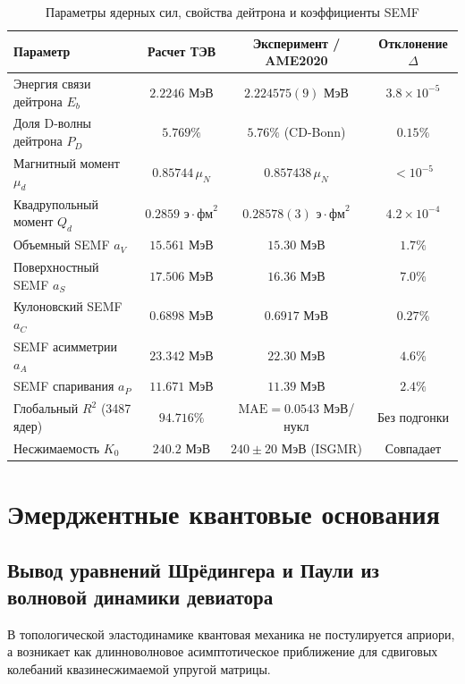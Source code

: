 \documentclass[11pt,a4paper]{article}
\theoremstyle{definition}
\theoremstyle{remark}
\begin{document}
\begin{table}[H]
\centering
\small
\caption{Параметры ядерных сил, свойства дейтрона и коэффициенты SEMF}
\label{tab:nuclear}
\vspace{2mm}
\begin{tabular}{lccc}
\toprule
\textbf{Параметр} & \textbf{Расчет ТЭВ} & \textbf{Эксперимент / AME2020} & \textbf{Отклонение $\Delta$} \\
\midrule
Энергия связи дейтрона $E_b$ & $2.2246$ МэВ & $2.224575(9)$ МэВ & $3.8 \times 10^{-5}$ \\
Доля D-волны дейтрона $P_D$ & $5.769\%$ & $5.76\%$ (CD-Bonn) & $0.15\%$ \\
Магнитный момент $\mu_d$ & $0.85744\,\mu_N$ & $0.857438\,\mu_N$ & $< 10^{-5}$ \\
Квадрупольный момент $Q_d$ & $0.2859\text{ э}\cdot\text{фм}^2$ & $0.28578(3)\text{ э}\cdot\text{фм}^2$ & $4.2 \times 10^{-4}$ \\
\midrule
Объемный SEMF $a_V$ & $15.561$ МэВ & $15.30$ МэВ & $1.7\%$ \\
Поверхностный SEMF $a_S$ & $17.506$ МэВ & $16.36$ МэВ & $7.0\%$ \\
Кулоновский SEMF $a_C$ & $0.6898$ МэВ & $0.6917$ МэВ & $0.27\%$ \\
SEMF асимметрии $a_A$ & $23.342$ МэВ & $22.30$ МэВ & $4.6\%$ \\
SEMF спаривания $a_P$ & $11.671$ МэВ & $11.39$ МэВ & $2.4\%$ \\
Глобальный $R^2$ (3487 ядер) & $94.716\%$ & $\text{MAE} = 0.0543$ МэВ/нукл & Без подгонки \\
Несжимаемость $K_0$ & $240.2$ МэВ & $240 \pm 20$ МэВ (ISGMR) & Совпадает \\
\bottomrule
\end{tabular}
\end{table}


\section{Эмерджентные квантовые основания}
\label{sec:quantum_foundations}

\subsection{Вывод уравнений Шрёдингера и Паули из волновой динамики девиатора}
В топологической эластодинамике квантовая механика не постулируется априори, а возникает как длинноволновое асимптотическое приближение для сдвиговых колебаний квазинесжимаемой упругой матрицы.
\end{document}
